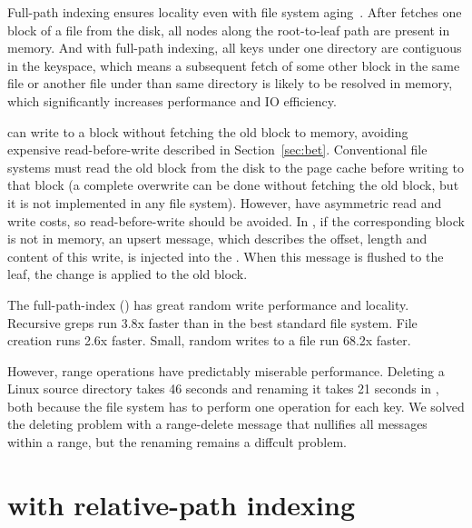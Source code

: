Full-path indexing ensures locality even with file system aging~\citep{betrfs3}.
After \betrfs fetches one block of a file from the disk, all nodes along the
root-to-leaf path are present in memory.
And with full-path indexing, all keys under one directory are contiguous in the
keyspace, which means a subsequent fetch of some other block in the same file or
another file under than same directory is likely to be resolved in memory,
which significantly increases performance and IO efficiency.

\betrfs can write to a block without fetching the old block to memory, avoiding
expensive read-before-write described in Section~\ref{sec:bet}.
Conventional file systems must read the old block from the disk to the page
cache before writing to that block (a complete overwrite can be done without
fetching the old block, but it is not implemented in any file system).
However, \bets have asymmetric read and write costs, so read-before-write should
be avoided.
In \betrfs, if the corresponding block is not in memory, an upsert message,
which describes the offset, length and content of this write, is injected into
the \bet.
When this message is flushed to the leaf, the change is applied to the old
block.

The full-path-index \betrfs (\betrfsOne) has great random write performance
and locality.
Recursive greps run 3.8x faster than in the best standard file system.
File creation runs 2.6x faster.
Small, random writes to a file run 68.2x faster.

However, range operations have predictably miserable performance.
Deleting a Linux source directory takes 46 seconds and renaming it takes
21 seconds in \betrfsOne, both because the file system has to perform one
operation for each key.
We solved the deleting problem with a range-delete message that nullifies all
messages within a range, but the renaming remains a diffcult problem.

\section{\betrfs with relative-path indexing}
\label{sec:rpi}

